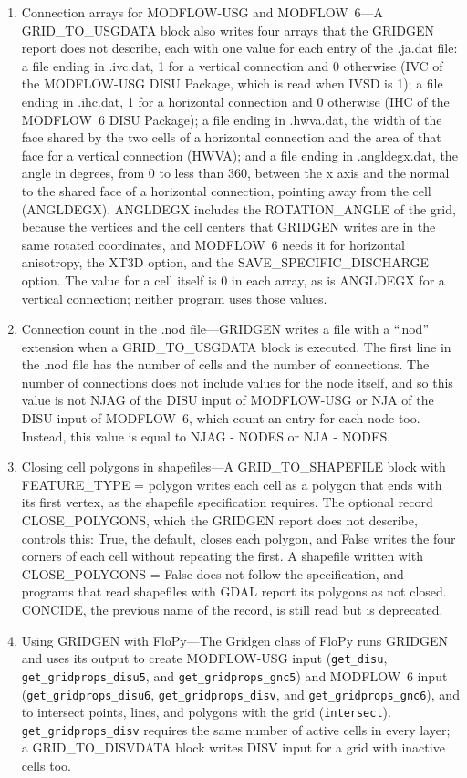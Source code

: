 \documentclass[11pt,twoside,twocolumn]{usgsreport}
\begin{document}
\begin{enumerate}
  \item Connection arrays for MODFLOW-USG and MODFLOW~6---A GRID\_TO\_USGDATA block also writes four arrays that the GRIDGEN report does not describe, each with one value for each entry of the .ja.dat file: a file ending in .ivc.dat, 1 for a vertical connection and 0 otherwise (IVC of the MODFLOW-USG DISU Package, which is read when IVSD is 1); a file ending in .ihc.dat, 1 for a horizontal connection and 0 otherwise (IHC of the MODFLOW~6 DISU Package); a file ending in .hwva.dat, the width of the face shared by the two cells of a horizontal connection and the area of that face for a vertical connection (HWVA); and a file ending in .angldegx.dat, the angle in degrees, from 0 to less than 360, between the x axis and the normal to the shared face of a horizontal connection, pointing away from the cell (ANGLDEGX). ANGLDEGX includes the ROTATION\_ANGLE of the grid, because the vertices and the cell centers that GRIDGEN writes are in the same rotated coordinates, and MODFLOW~6 needs it for horizontal anisotropy, the XT3D option, and the SAVE\_SPECIFIC\_DISCHARGE option. The value for a cell itself is 0 in each array, as is ANGLDEGX for a vertical connection; neither program uses those values.
  \item Connection count in the .nod file---GRIDGEN writes a file with a ``.nod'' extension when a GRID\_TO\_USGDATA block is executed. The first line in the .nod file has the number of cells and the number of connections. The number of connections does not include values for the node itself, and so this value is not NJAG of the DISU input of MODFLOW-USG or NJA of the DISU input of MODFLOW~6, which count an entry for each node too. Instead, this value is equal to NJAG - NODES or NJA - NODES.
  \item Closing cell polygons in shapefiles---A GRID\_TO\_SHAPEFILE block with FEATURE\_TYPE = polygon writes each cell as a polygon that ends with its first vertex, as the shapefile specification requires. The optional record CLOSE\_POLYGONS, which the GRIDGEN report does not describe, controls this: True, the default, closes each polygon, and False writes the four corners of each cell without repeating the first. A shapefile written with CLOSE\_POLYGONS = False does not follow the specification, and programs that read shapefiles with GDAL report its polygons as not closed. CONCIDE, the previous name of the record, is still read but is deprecated.
  \item Using GRIDGEN with FloPy---The Gridgen class of FloPy \citep{bakker2016flopy, hughes2023flopy} runs GRIDGEN and uses its output to create MODFLOW-USG input (\texttt{get\_disu}, \texttt{get\_gridprops\_disu5}, and \texttt{get\_gridprops\_gnc5}) and MODFLOW~6 input (\texttt{get\_gridprops\_disu6}, \texttt{get\_gridprops\_disv}, and \texttt{get\_gridprops\_gnc6}), and to intersect points, lines, and polygons with the grid (\texttt{intersect}). \texttt{get\_gridprops\_disv} requires the same number of active cells in every layer; a GRID\_TO\_DISVDATA block writes DISV input for a grid with inactive cells too.
\end{enumerate}
\end{document}
